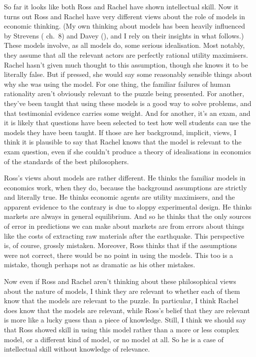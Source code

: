 \documentclass[
  10pt,
  letterpaper,
  DIV=11,
  numbers=noendperiod,
  twoside]{scrartcl}
\begin{document}
So far it looks like both Ross and Rachel have shown intellectual skill.
Now it turns out Ross and Rachel have very different views about the
role of models in economic thinking. (My own thinking about models has
been heavily influenced by Strevens (
ch.~8) and Davey (), and I rely on their
insights in what follows.) These models involve, as all models do, some
serious idealisation. Most notably, they assume that all the relevant
actors are perfectly rational utility maximisers. Rachel hasn't given
much thought to this assumption, though she knows it to be literally
false. But if pressed, she would say some reasonably sensible things
about why she was using the model. For one thing, the familiar failures
of human rationality aren't obviously relevant to the puzzle being
presented. For another, they've been taught that using these models is a
good way to solve problems, and that testimonial evidence carries some
weight. And for another, it's an exam, and it is likely that questions
have been selected to test how well students can use the models they
have been taught. If those are her background, implicit, views, I think
it is plausible to say that Rachel knows that the model is relevant to
the exam question, even if she couldn't produce a theory of
idealisations in economics of the standards of the best philosophers.

Ross's views about models are rather different. He thinks the familiar
models in economics work, when they do, because the background
assumptions are strictly and literally true. He thinks economic agents
are utility maximisers, and the apparent evidence to the contrary is due
to sloppy experimental design. He thinks markets are always in general
equilibrium. And so he thinks that the only sources of error in
predictions we can make about markets are from errors about things like
the costs of extracting raw materials after the earthquake. This
perspective is, of course, grossly mistaken. Moreover, Ross thinks that
if the assumptions were not correct, there would be no point in using
the models. This too is a mistake, though perhaps not as dramatic as his
other mistakes.

Now even if Ross and Rachel aren't thinking about these philosophical
views about the nature of models, I think they are relevant to whether
each of them know that the models are relevant to the puzzle. In
particular, I think Rachel does know that the models are relevant, while
Ross's belief that they are relevant is more like a lucky guess than a
piece of knowledge. Still, I think we should say that Ross showed skill
in using this model rather than a more or less complex model, or a
different kind of model, or no model at all. So he is a case of
intellectual skill without knowledge of relevance.
\end{document}
